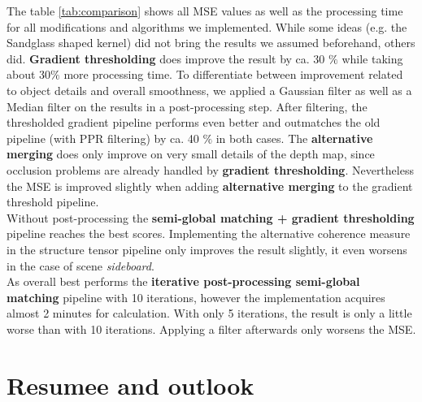 \documentclass  [
  paper    = a4,
  BCOR     = 10mm,
  twoside,
  fontsize = 12pt,
  fleqn,
  toc      = bibnumbered,
  toc      = listofnumbered,
  numbers  = noendperiod,
  headings = normal,
  listof   = leveldown,
  version  = 3.03
]                                       {scrreprt}
\begin{document}
The table \ref{tab:comparison}  shows all MSE values as well as the processing time for all modifications and algorithms we implemented. While some ideas (e.g. the Sandglass shaped kernel) did not bring the results we assumed beforehand, others did. \textbf{ Gradient thresholding} does improve the result by ca. 30 $\%$ while taking about 30$\%$ more processing time. To differentiate between improvement related to object details and overall smoothness, we applied a Gaussian filter as well as a Median filter on the results in a post-processing step. After filtering, the thresholded gradient pipeline performs even better and outmatches the old pipeline (with PPR filtering) by ca. 40 $\%$ in both cases. The \textbf{alternative merging} does only improve on very small details of the depth map, since occlusion problems are already handled by \textbf{ gradient thresholding}. Nevertheless the MSE is improved slightly when adding \textbf{alternative merging} to the gradient threshold pipeline.\\
Without post-processing the \textbf{semi-global matching + gradient thresholding} pipeline reaches the best scores. Implementing the alternative coherence measure in the structure tensor pipeline only improves the result slightly, it even worsens in the case of scene \textit{sideboard}.\\
As overall best performs the \textbf{iterative post-processing semi-global matching} pipeline with 10 iterations, however the implementation acquires almost 2 minutes for calculation. With only 5 iterations, the result is only a little worse than with 10 iterations. Applying a filter afterwards only worsens the MSE.

\chapter{Resumee and outlook}
\end{document}

